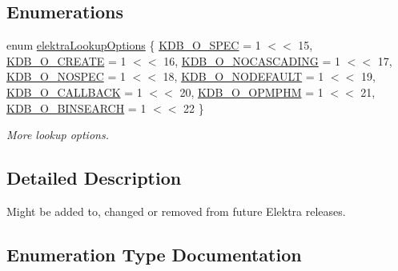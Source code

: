 \subsection*{Enumerations}
\begin{DoxyCompactItemize}
\item 
enum \hyperlink{group__proposal_ga93673533c4c8eb1fdfca76b98c5f49b0}{elektra\+Lookup\+Options} \{ \newline
\hyperlink{group__proposal_gga93673533c4c8eb1fdfca76b98c5f49b0a187bc7e52493fb8f1eb5693015478dae}{K\+D\+B\+\_\+\+O\+\_\+\+S\+P\+EC} = 1 $<$$<$ 15, 
\hyperlink{group__proposal_gga93673533c4c8eb1fdfca76b98c5f49b0a72155bedec545b2e96372ab28169620a}{K\+D\+B\+\_\+\+O\+\_\+\+C\+R\+E\+A\+TE} = 1 $<$$<$ 16, 
\hyperlink{group__proposal_gga93673533c4c8eb1fdfca76b98c5f49b0abc4c6e04823b6d684f4db8df3b84f326}{K\+D\+B\+\_\+\+O\+\_\+\+N\+O\+C\+A\+S\+C\+A\+D\+I\+NG} = 1 $<$$<$ 17, 
\hyperlink{group__proposal_gga93673533c4c8eb1fdfca76b98c5f49b0a420d8ea3671ffea4fe8400570cfe5c8d}{K\+D\+B\+\_\+\+O\+\_\+\+N\+O\+S\+P\+EC} = 1 $<$$<$ 18, 
\newline
\hyperlink{group__proposal_gga93673533c4c8eb1fdfca76b98c5f49b0abdcfd6d28200b5c650615fba430496bb}{K\+D\+B\+\_\+\+O\+\_\+\+N\+O\+D\+E\+F\+A\+U\+LT} = 1 $<$$<$ 19, 
\hyperlink{group__proposal_gga93673533c4c8eb1fdfca76b98c5f49b0a70ac5d04d6f855e17e4c33dfeeddd39e}{K\+D\+B\+\_\+\+O\+\_\+\+C\+A\+L\+L\+B\+A\+CK} = 1 $<$$<$ 20, 
\hyperlink{group__proposal_gga93673533c4c8eb1fdfca76b98c5f49b0afe9f6ff6e374540baf600a918b07ee6e}{K\+D\+B\+\_\+\+O\+\_\+\+O\+P\+M\+P\+HM} = 1 $<$$<$ 21, 
\hyperlink{group__proposal_gga93673533c4c8eb1fdfca76b98c5f49b0ac67a43bd273203575090d26010f6c995}{K\+D\+B\+\_\+\+O\+\_\+\+B\+I\+N\+S\+E\+A\+R\+CH} = 1 $<$$<$ 22
 \}\begin{DoxyCompactList}\small\item\em More lookup options. \end{DoxyCompactList}
\end{DoxyCompactItemize}


\subsection{Detailed Description}
Might be added to, changed or removed from future Elektra releases. 



\subsection{Enumeration Type Documentation}
\mbox{\label{group__proposal_ga93673533c4c8eb1fdfca76b98c5f49b0}} 
